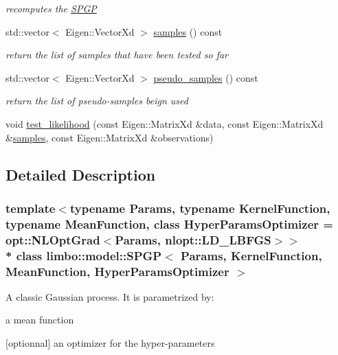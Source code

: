 \begin{DoxyCompactItemize}
\begin{DoxyCompactList}\small\item\em recomputes the \hyperlink{classlimbo_1_1model_1_1_s_p_g_p}{S\+P\+GP} \end{DoxyCompactList}\item 
std\+::vector$<$ Eigen\+::\+Vector\+Xd $>$ \hyperlink{classlimbo_1_1model_1_1_s_p_g_p_a867505eb41e8fe971eb7de28b2cea50f}{samples} () const 
\begin{DoxyCompactList}\small\item\em return the list of samples that have been tested so far \end{DoxyCompactList}\item 
std\+::vector$<$ Eigen\+::\+Vector\+Xd $>$ \hyperlink{classlimbo_1_1model_1_1_s_p_g_p_aa5b380d8bd02f7a4a7a759038469b20b}{pseudo\+\_\+samples} () const 
\begin{DoxyCompactList}\small\item\em return the list of pseudo-\/samples beign used \end{DoxyCompactList}\item 
void \hyperlink{classlimbo_1_1model_1_1_s_p_g_p_a0f36e61908b422052019819cb8c8e57d}{test\+\_\+likelihood} (const Eigen\+::\+Matrix\+Xd \&data, const Eigen\+::\+Matrix\+Xd \&\hyperlink{classlimbo_1_1model_1_1_s_p_g_p_a867505eb41e8fe971eb7de28b2cea50f}{samples}, const Eigen\+::\+Matrix\+Xd \&observations)
\end{DoxyCompactItemize}


\subsection{Detailed Description}
\subsubsection*{template$<$typename Params, typename Kernel\+Function, typename Mean\+Function, class Hyper\+Params\+Optimizer = opt\+::\+N\+L\+Opt\+Grad$<$\+Params, nlopt\+::\+L\+D\+\_\+\+L\+B\+F\+G\+S$>$$>$\\*
class limbo\+::model\+::\+S\+P\+G\+P$<$ Params, Kernel\+Function, Mean\+Function, Hyper\+Params\+Optimizer $>$}

A classic Gaussian process. It is parametrized by\+:
\begin{DoxyItemize}
\item a mean function
\item \mbox{[}optionnal\mbox{]} an optimizer for the hyper-\/parameters 
\end{DoxyItemize}

